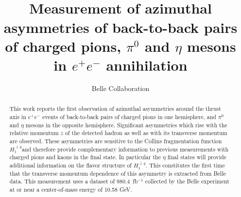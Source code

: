 \documentclass[aps,prX,preprint,groupedaddress,linenumbers]{revtex4-1}
\newcommand{\CFF}{$H_1^{\perp q}$}
\begin{document}

\title{\quad\\[0.5cm]Measurement of azimuthal asymmetries of back-to-back pairs of charged pions, $\pi^0$ and $\eta$ mesons in $e^+e^-$ annihilation}


\author{Belle Collaboration}
\affiliation{--}

\begin{abstract}
This work reports the first observation of azimuthal asymmetries around the thrust axis in $e^+e^-$ events of back-to-back pairs of charged pions in one hemisphere, and $\pi^0$ and $\eta$ mesons in the opposite hemisphere. Significant asymmetries which rise with the relative momentum $z$ of the detected hadron as well as with its transverse momentum are observed. 
These asymmetries are sensitive to the Collins fragmentation function \CFF and therefore provide complementary information to previous measurements with charged pions and kaons in the final state. In particular the $\eta$ final states will provide additional information on the flavor structure of \CFF. This constitutes the first time that the transverse momentum dependence of this asymmetry is extracted from Belle data.  
This measurement uses a dataset of 980.4~fb$^{-1}$ collected by the Belle experiment at or near a center-of-mass energy of 10.58 GeV.
\end{abstract}
\maketitle
\end{document}
